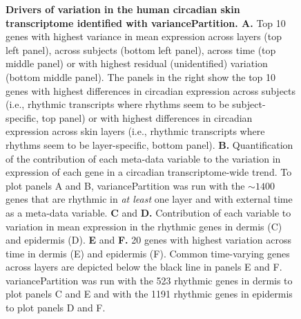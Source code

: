 \begin{figure}[b!]
\begin{center}
	\end{center}
\end{figure}

\begin{figure}[!]
	\begin{center}
		\caption{\textbf{Drivers of variation in the human circadian skin transcriptome identified with variancePartition. A.} Top 10 genes with highest variance in mean expression across layers (top left panel), across subjects (bottom left panel), across time (top middle panel) or with highest residual (unidentified) variation (bottom middle panel). The panels in the right show the top 10 genes with highest differences in circadian expression across subjects (i.e., rhythmic transcripts where rhythms seem to be subject-specific, top panel) or with highest differences in circadian expression across skin layers (i.e., rhythmic transcripts where rhythms seem to be layer-specific, bottom panel). \textbf{B.} Quantification of the contribution of each meta-data variable to the variation in expression of each gene in a circadian transcriptome-wide trend. To plot panels A and B, variancePartition was run with the $\sim1400$ genes that are rhythmic in \textit{at least} one layer and with external time as a meta-data variable. \textbf{C} and \textbf{D.} Contribution of each variable to variation in mean expression in the rhythmic genes in dermis (C) and epidermis (D). \textbf{E} and \textbf{F. } 20 genes with highest variation across time in dermis (E) and epidermis (F). Common time-varying genes across layers are depicted below the black line in panels E and F. variancePartition was run with the 523 rhythmic genes in dermis to plot panels C and E and with the 1191 rhythmic genes in epidermis to plot panels D and F.}
		
		\label{fig:fig2}
	\end{center}
\end{figure}
